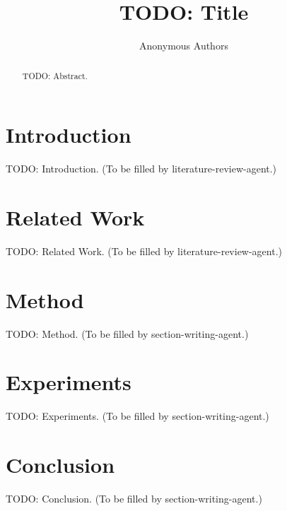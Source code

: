 \documentclass{article}
\title{TODO: Title}
\author{Anonymous Authors}
\date{}
\begin{document}
\maketitle

\begin{abstract}
TODO: Abstract.
\end{abstract}

\section{Introduction}
TODO: Introduction. (To be filled by literature-review-agent.)

\section{Related Work}
TODO: Related Work. (To be filled by literature-review-agent.)

\section{Method}
TODO: Method. (To be filled by section-writing-agent.)

\section{Experiments}
TODO: Experiments. (To be filled by section-writing-agent.)

\section{Conclusion}
TODO: Conclusion. (To be filled by section-writing-agent.)



\end{document}
